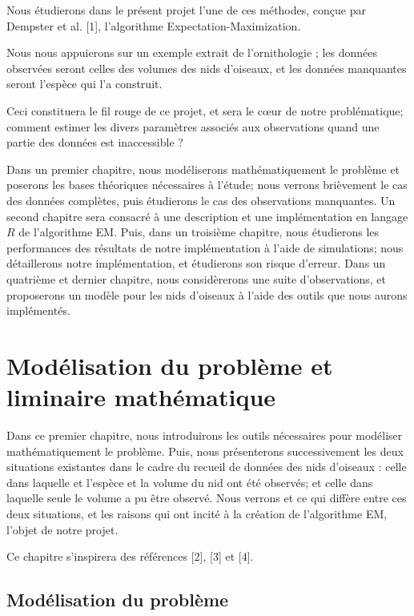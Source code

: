 \documentclass[frenchb]{report}
\newcommand{\1}{\mathbbm{1}}
\theoremstyle{definition}\newtheorem{defn}{Définition}
\theoremstyle{definition}\newtheorem{exm}{Exemple}
\theoremstyle{definition}\newtheorem{nota}{Notation}
\theoremstyle{definition}\newtheorem{rem}{Remarque}
\begin{document}
Nous étudierons dans le présent projet l’une de ces méthodes, conçue par Dempster et al. [1], l’algorithme Expectation-Maximization.  

Nous nous appuierons sur un exemple extrait de l’ornithologie ; les données observées seront celles des volumes des nids d’oiseaux, et les données manquantes seront l’espèce qui l’a construit.

Ceci constituera le fil rouge de ce projet, et sera le cœur de notre problématique; comment estimer les divers paramètres associés aux observations quand une partie des données est inaccessible ?

Dans un premier chapitre, nous modéliserons mathématiquement le problème et poserons les bases théoriques nécessaires à l’étude; nous verrons brièvement le cas des données complètes, puis étudierons le cas des observations manquantes. Un second chapitre sera consacré à une description et une implémentation en langage $R$ de l’algorithme EM. Puis, dans un troisième chapitre, nous étudierons les performances des résultats de notre implémentation à l'aide de simulations; nous détaillerons notre implémentation, et étudierons son risque d'erreur. Dans un quatrième et dernier chapitre, nous considèrerons une suite d'observations, et proposerons un modèle pour les nids d'oiseaux à l'aide des outils que nous aurons implémentés.

\pagebreak


\chapter{Modélisation du problème et liminaire mathématique}
Dans ce premier chapitre, nous introduirons les outils nécessaires pour modéliser mathématiquement le problème. Puis, nous présenterons successivement les deux situations existantes dans le cadre du recueil de données des nids d'oiseaux : celle dans laquelle et l'espèce et la volume du nid ont été observés; et celle dans laquelle seule le volume a pu être observé.
Nous verrons et ce qui diffère entre ces deux situations, et les raisons qui ont incité à la création de l’algorithme EM, l’objet de notre projet. 

Ce chapitre s'inspirera des références [2], [3] et [4].

\section{Modélisation du problème}
\end{document}
